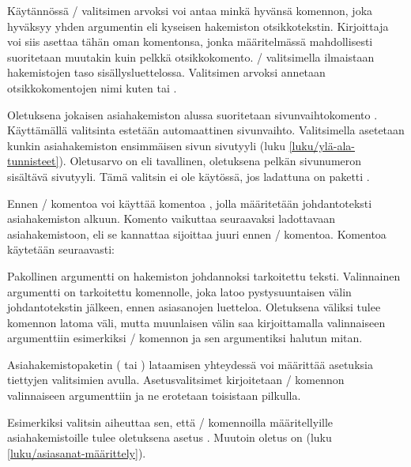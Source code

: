 Käytännössä \-/ valitsimen arvoksi voi antaa minkä hyvänsä
komennon, joka hyväksyy yhden argumentin eli kyseisen hakemiston
otsikkotekstin. Kirjoittaja voi siis asettaa tähän oman komentonsa,
jonka määritelmässä mahdollisesti suoritetaan muutakin kuin pelkkä
otsikkokomento. \-/ valitsimella ilmaistaan hakemistojen
taso sisällysluettelossa. Valitsimen arvoksi annetaan otsikkokomentojen
nimi kuten  tai .

Oletuksena jokaisen asiahakemiston alussa suoritetaan sivunvaihtokomento
. Käyttämällä valitsinta  estetään
automaattinen sivunvaihto. Valitsimella  asetetaan
kunkin asiahakemiston ensimmäisen sivun sivutyyli (luku
\ref{luku/ylä-ala-tunnisteet}). Oletusarvo on  eli
tavallinen, oletuksena pelkän sivunumeron sisältävä sivutyyli. Tämä
valitsin ei ole käytössä, jos ladattuna on paketti .

Ennen \-/ komentoa voi käyttää komentoa
, jolla määritetään johdantoteksti asiahakemiston
alkuun. Komento vaikuttaa seuraavaksi ladottavaan asiahakemistoon, eli
se kannattaa sijoittaa juuri ennen \-/ komentoa.
Komentoa käytetään seuraavasti:

\begin{koodilohkosis}
\end{koodilohkosis}

\noindent
Pakollinen argumentti  on hakemiston johdannoksi
tarkoitettu teksti. Valinnainen argumentti  on tarkoitettu
komennolle, joka latoo pystysuuntaisen välin johdantotekstin jälkeen,
ennen asiasanojen luetteloa. Oletuksena väliksi tulee komennon
 latoma väli, mutta muunlaisen välin saa kirjoittamalla
valinnaiseen argumenttiin esimerkiksi \-/ komennon ja
sen argumentiksi halutun mitan.

Asiahakemistopaketin ( tai )
lataamisen yhteydessä voi määrittää asetuksia tiettyjen valitsimien
avulla. Asetusvalitsimet kirjoitetaan \-/ komennon
valinnaiseen argumenttiin ja ne erotetaan toisistaan pilkulla.

Esimerkiksi valitsin  aiheuttaa sen, että
\-/ komennoilla määritellyille asiahakemistoille
tulee oletuksena asetus . Muutoin oletus on
 (luku \ref{luku/asiasanat-määrittely}).


